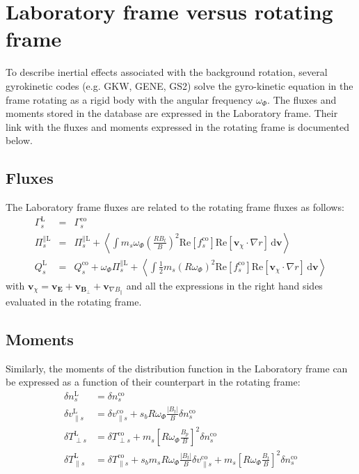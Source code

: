 \documentclass[a4paper]{report}
\begin{document}
\section{Laboratory frame versus rotating frame} \label{sec:labrotframes}
To describe inertial effects associated with the background rotation, several gyrokinetic codes (e.g. GKW, GENE, GS2) solve the gyro-kinetic equation in the frame rotating as a rigid body with the angular frequency $\omega_\Phi$. The fluxes and moments stored in the database are expressed in the Laboratory frame. Their link with the fluxes and moments expressed in the rotating frame is documented below.

\subsection{Fluxes} 
The Laboratory frame fluxes are related to the rotating frame fluxes as follows:
\begin{eqnarray}
\Gamma_s^\textrm{L} &=& \Gamma_s^\textrm{co} \\
\Pi_s^{\parallel \textrm{L}} &=& \Pi_s^{\parallel \textrm{L}} + \left< \int m_s\omega_\Phi\left(\frac{RB_t}{B}\right)^2 \textrm{Re}\left[f_s^\textrm{co}\right]\textrm{Re}\left[ \mathbf{v}_\chi\cdot \nabla r \right] \,\textrm{d}\mathbf{v}\right>\\
Q_s^\textrm{L} &=& Q_s^\textrm{co} + \omega_\Phi \Pi_s^{\parallel \textrm{L}}
+ \left< \int \frac{1}{2}m_s(R\omega_\Phi)^2 \textrm{Re}\left[f_s^\textrm{co}\right]\textrm{Re}\left[ \mathbf{v}_\chi\cdot \nabla r \right]\,\textrm{d}\mathbf{v}\right> 
\end{eqnarray}
with $\mathbf{v}_\chi=\mathbf{v}_\mathbf{E} + \mathbf{v}_{\mathbf{B}_\perp}+ \mathbf{v}_{\nabla B_\parallel}$ and all the expressions in the right hand sides evaluated in the rotating frame. 

\subsection{Moments} 
Similarly, the moments of the distribution function in the Laboratory frame can be expressed as a function of their counterpart in the rotating frame:
\begin{align*}
\delta n_s^\textrm{L} & = \delta n_s^\textrm{co} \\
\delta v_{\parallel s}^\textrm{L} & = \delta v_{\parallel s}^\textrm{co} + s_bR\omega_\Phi\frac{|B_t|}{B}\delta n_s^\textrm{co} \\
\delta T_{\perp s}^\textrm{L} & = \delta T_{\perp s}^\textrm{co} + m_s\left[R\omega_\Phi\frac{B_p}{B}\right]^2 \delta n_s^\textrm{co}\\
\delta T_{\parallel s}^\textrm{L} & = \delta T_{\parallel s}^\textrm{co} + s_bm_s R\omega_\Phi\frac{|B_t|}{B} \delta v_{\parallel s}^\textrm{co} + m_s\left[R\omega_\Phi\frac{B_t}{B}\right]^2 \delta n_s^\textrm{co}
\end{align*}
\end{document}
